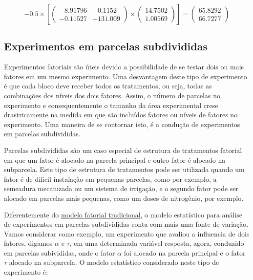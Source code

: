 \documentclass[
]{book}
\begin{document}
\[
- 0.5 \times \left[ {\left( {\begin{array}{*{20}{c}}{ - 8.91796}&{ - 0.1152}\\{ - 0.11527}&{ - 131.009}\end{array}} \right) \times \left( \begin{array}{l}14.7502\\1.00569\end{array} \right)} \right] = \left( \begin{array}{l}65.8292\\66.7277\end{array} \right)
\]

\hypertarget{experimentos-em-parcelas-subdivididas}{%
\subsection{Experimentos em parcelas subdivididas}\label{experimentos-em-parcelas-subdivididas}}

Experimentos fatoriais são úteis devido a possibilidade de se testar dois ou mais fatores em um mesmo experimento. Uma desvantagem deste tipo de experimento é que cada bloco deve receber todos os tratamentos, ou seja, todas as combinações dos níveis dos dois fatores. Assim, o número de parcelas no experimento e consequentemente o tamanho da área experimental crese drastricamente na medida em que são incluídos fatores ou níveis de fatores no experimento. Uma maneira de se contornar isto, é a condução de experimentos em parcelas subdivididas.

Parcelas subdivididas  são um caso especial de estrutura de tratamentos fatorial em que um fator é alocado na parcela principal e outro fator é alocado na subparcela. Este tipo de estrutura de tratamentos pode ser utilizada quando um fator é de dificil instalação em pequenas parcelas, como por exemplo, a semeadura mecanizada ou um sistema de irrigação, e o segundo fator pode ser alocado em parcelas mais pequenas, como um doses de nitrogênio, por exemplo.

Diferentemente do \protect\hyperlink{experimentos-bifatoriais}{modelo fatorial tradicional}, o modelo estatístico para análise de experimentos em parcelas subdivididas conta com mais uma fonte de variação. Vamos considerar como exemplo, um experimento que avaliou a influencia de dois fatores, digamos \(\alpha\) e \(\tau\), em uma determinada variável resposta, agora, conduzido em parcelas subivididas, onde o fator \(\alpha\) foi alocado na parcela principal e o fator \(\tau\) alocado na subparcela. O modelo estatístico considerado neste tipo de experimento é:
\end{document}
